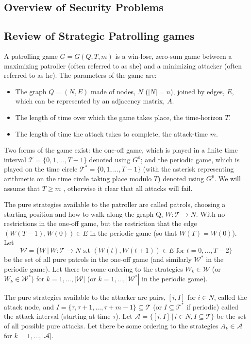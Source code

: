 \documentclass[a4paper,10pt]{article}
\theoremstyle{definition}
\theoremstyle{definition}
\theoremstyle{remark}
\theoremstyle{definition}
\begin{document}
\subsection{Overview of Security Problems}





\subsection{Review of Strategic Patrolling games}
A patrolling game $G=G(Q,T,m)$ is a win-lose, zero-sum game between a maximizing patroller (often referred to as she) and a minimizing attacker (often referred to as he). The parameters of the game are:
\begin{itemize}
\item The graph $Q=(N,E)$ made of nodes, $N$ ($|N|=n$), joined by edges, $E$, which can be represented by an adjacency matrix, $A$.
\item The length of time over which the game takes place, the time-horizon $T$.
\item The length of time the attack takes to complete, the attack-time $m$.
\end{itemize}

Two forms of the game exist: the one-off game, which is played in a finite time interval $\mathcal{T}=\{0,1,...,T-1\}$ denoted using $G^{o}$; and the periodic game, which is played on the time circle $\mathcal{T}^*=\{0,1,...,T-1\}$ (with the asterisk representing arithmetic on the time circle taking place modulo $T$) denoted using $G^p$. We will assume that $T \geq m$ , otherwise it clear that all attacks will fail.

The pure strategies available to the patroller are called patrols, choosing a starting position and how to walk along the graph Q, $W:\mathcal{T} \rightarrow N$. With no restrictions in the one-off game, but the restriction that the edge $(W(T-1),W(0)) \in E$ in the periodic game (so that $W(T)=W(0)$). Let $$\mathcal{W}=\{ W \, | \, W:\mathcal{T} \rightarrow N \text{ s.t } (W(t),W(t+1)) \in E \text{ for } t=0,...,T-2  \} $$ be the set of all pure patrols in the one-off game (and similarly $\mathcal{W}^*$ in the periodic game). Let there be some ordering to the strategies $W_{k} \in \mathcal{W}$ (or $W_{k} \in \mathcal{W}^{*}$) for $k=1,...,|\mathcal{W}|$ (or $k=1,...,|\mathcal{W}^*|$ in the periodic game).

The pure strategies available to the attacker are pairs, $[i,I]$ for $i \in N$, called the attack node, and $I=\{ \tau,\tau+1,...,\tau+m-1 \} \subseteq \mathcal{T}$ (or $I \subseteq \mathcal{T}^*$ if periodic) called the attack interval (starting at time $\tau$). Let $\mathcal{A}=\{[i,I] \, | \, i \in N , I \subseteq \mathcal{T} \}$ be the set of all possible pure attacks. Let there be some ordering to the strategies $A_{k} \in \mathcal{A}$ for $k=1,...,|\mathcal{A}|$.
\end{document}
